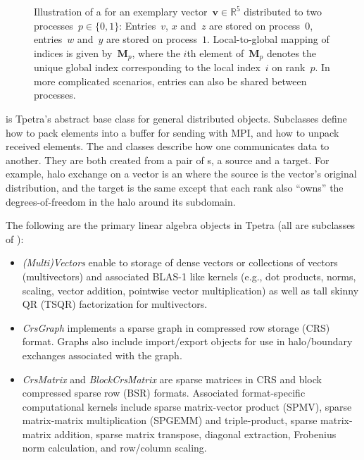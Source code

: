 \begin{figure}

\caption{Illustration of a  for an exemplary vector~$\mathbf{v}\in\mathbb{R}^5$ distributed to two processes~$p\in\{0,1\}$: Entries~$v$, $x$ and~$z$ are stored on process~$0$, entries~$w$ and~$y$ are stored on process~$1$. Local-to-global mapping of indices is given by~$\mathbf{M}_p$, where the $i$th element of~$\mathbf{M}_p$ denotes the unique global index corresponding to the local index~$i$ on rank~$p$. In more complicated scenarios, entries can also be shared between processes.}
\label{fig:Map}
\end{figure}

 is Tpetra's abstract base class for general distributed objects.
Subclasses define how to pack elements into a buffer for sending with MPI, and how to unpack received elements.
The  and  classes describe how one  communicates data to another.
They are both created from a pair of s, a source and a target. For example, halo exchange on a vector is an  where
the source is the vector's original distribution, and the target is the same except that each rank
also ``owns'' the degrees-of-freedom in the halo around its subdomain.

The following are the primary linear algebra objects in Tpetra (all are subclasses of ):
\begin{itemize}
\item \emph{(Multi)Vectors} enable to storage of dense vectors or collections of
vectors (multivectors) and associated BLAS-1 like kernels (e.g., dot
products, norms, scaling, vector addition, pointwise vector
multiplication) as well as tall skinny QR (TSQR) factorization for multivectors.
\item \emph{CrsGraph} implements a sparse graph in compressed row storage (CRS)
format. Graphs also include import/export objects for use in
halo/boundary exchanges associated with the graph.
\item \emph{CrsMatrix} and \emph{BlockCrsMatrix} are sparse matrices in CRS and
block compressed sparse row (BSR) formats. Associated format-specific computational kernels include
sparse matrix-vector product (SPMV), sparse matrix-matrix
multiplication (SPGEMM) and triple-product, sparse matrix-matrix addition, sparse matrix transpose, diagonal extraction,
Frobenius norm calculation, and row/column scaling.
\end{itemize}


